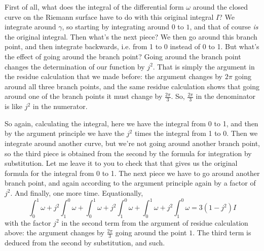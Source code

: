 \documentclass{article}
\begin{document}
First of all, what does the integral of the differential form \(\omega\) around the closed curve on the Riemann surface have to do with this original integral \(I\)? We integrate around \(\gamma\), so starting by integrating around \(0\) to \(1\), and that of course \textit{is} the original integral. Then what's the next piece? We then go around this branch point, and then integrate backwards, i.e. from 1 to 0 instead of 0 to 1. But what's the effect of going around the branch point? Going around the branch point changes the determination of our function by \(j^2\). That is simply the argument in the residue calculation that we made before: the argument changes by \(2\pi\) going around all three branch points, and the same residue calculation shows that going around one of the branch points it must change by \(\frac{2\pi}{3}\). So, \(\frac{2\pi}{3}\) in the denominator is like \(j^2\) in the numerator.

So again, calculating the integral, here we have the integral from 0 to 1, and then by the argument principle we have the \(j^2\) times the integral from 1 to 0. Then we integrate around another curve, but we're not going around another branch point, so the third piece is obtained from the second by the formula for integration by substitution. Let me leave it to you to check that that gives us the original formula for the integral from 0 to 1. The next piece we have to go around another branch point, and again according to the argument principle again by a factor of \(j^2\). And finally, one more time. Equationally,
\begin{equation}
  \int_0^1\omega + j^2\int_1^0\omega + \int_0^1\omega + j^2\int_1^0\omega + \int_0^1\omega + j^2\int_1^0\omega = 3(1 - j^2)I
\end{equation}
with the factor \(j^2\) in the second term from the argument of residue calculation above: the argument changes by \(\frac{2\pi}{3}\) going around the point \(1\). The third term is deduced from the second by substitution, and such.
\end{document}
